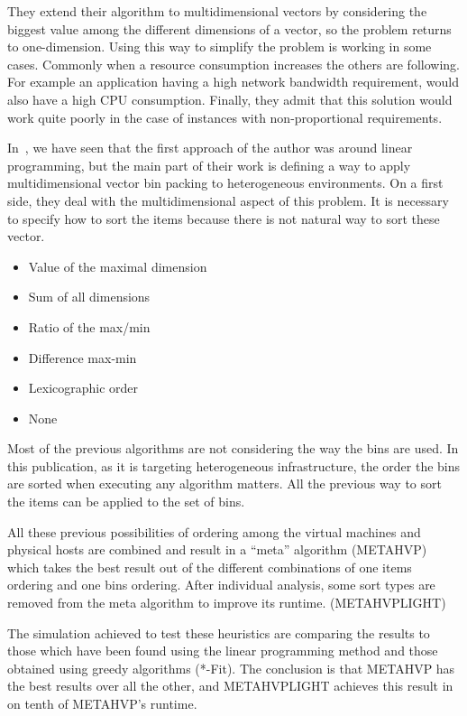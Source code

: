 They extend their algorithm to multidimensional vectors by considering the biggest
value among the different dimensions of a vector, so the problem returns to
one-dimension. Using this way to simplify the problem is working in some cases.
Commonly when a resource consumption increases the others are following. For
example an application having a high network bandwidth requirement, would also have a
high CPU consumption. Finally, they admit that this solution would work quite poorly
in the case of instances with non-proportional requirements.

In~\cite{allocationHeterogeneous}, we have seen that the first approach of the author
was around linear programming, but the main part of their work is defining a way
to apply multidimensional vector bin packing to heterogeneous environments. On a first side,
they deal with the multidimensional aspect of this problem. It is necessary to specify how to
sort the items because there is not natural way to sort these vector.

\begin{itemize}
	\item Value of the maximal dimension
	\item Sum of all dimensions
	\item Ratio of the max/min
	\item Difference max-min
	\item Lexicographic order
	\item None
\end{itemize}

Most of the previous algorithms are not considering the way the bins are used.
In this publication, as it is targeting heterogeneous infrastructure, the order
the bins are sorted when executing any algorithm matters. All the previous way to
sort the items can be applied to the set of bins.

All these previous possibilities of ordering among the virtual machines and physical
hosts are combined and result in a “meta” algorithm (METAHVP) which takes the best result
out of the different combinations of one items ordering and one bins ordering. After
individual analysis, some sort types are removed from the meta algorithm to improve
its runtime. (METAHVPLIGHT)

The simulation achieved to test these heuristics are comparing the results to those
which have been found using the linear programming method and those obtained using
greedy algorithms (*-Fit). The conclusion is that METAHVP has the best results over
all the other, and METAHVPLIGHT achieves this result in on tenth of METAHVP's runtime.

